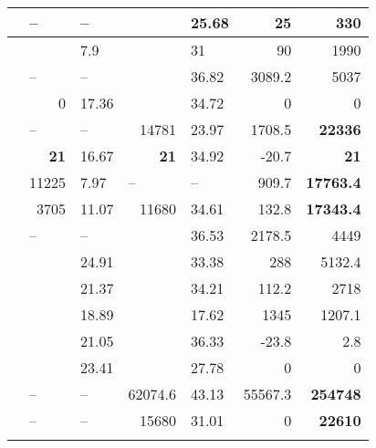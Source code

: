 \begin{table*}
{\begin{tabular}{@{}l|ra|ra|r|r@{}}
 &  &  &  & 25.68 & 25 & 330 \\ \hline
{} &  & 7.9 &  & 31 & 90 & 1990 \\ \hline
{} &  &  &  & 36.82 & 3089.2 & 5037 \\ \hline
{} & 0 & 17.36 &  & 34.72 & 0 & 0 \\ \hline
{} &  &  & 14781 & 23.97 & 1708.5 & \textbf{22336} \\ \hline
{} & \textbf{21} & 16.67 & \textbf{21} & 34.92 & -20.7 & \textbf{21} \\ \hline
{} & 11225 & 7.97 &  &  & 909.7 & \textbf{17763.4} \\ \hline
{} & 3705 & 11.07 & 11680 & 34.61 & 132.8 & \textbf{17343.4} \\ \hline
{} &  &  &  & 36.53 & 2178.5 & 4449 \\ \hline
{} &  & 24.91 &  & 33.38 & 288 & 5132.4 \\ \hline
{} &  & 21.37 &  & 34.21 & 112.2 & 2718 \\ \hline
{} &  & 18.89 &  & 17.62 & 1345 & 1207.1 \\ \hline
{} &  & 21.05 &  & 36.33 & -23.8 & 2.8 \\ \hline
{} &  & 23.41 &  & 27.78 & 0 & 0 \\ \hline
{} &  &  & 62074.6 & 43.13 & 55567.3 & \textbf{254748} \\ \hline
{} &  &  & 15680 & 31.01 & 0 & \textbf{22610} \\ \hline
{} &  &  &  &  &  &  \\ \hline

\end{tabular}}
\end{table*}
